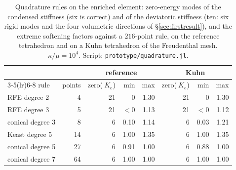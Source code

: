 \documentclass[11pt]{article}
\newcommand{\code}[1]{\texttt{#1}}
\theoremstyle{definition}
\theoremstyle{plain}
\begin{document}
\begin{table}[tbp]
\centering
\caption{Quadrature rules on the enriched element: zero-energy modes of the
condensed stiffness (six is correct) and of the deviatoric stiffness (ten:
six rigid modes and the four volumetric directions of
\S\ref{sec:firstresult}), and the extreme softening
factors against a $216$-point rule, on the reference tetrahedron and on a
Kuhn tetrahedron of the Freudenthal mesh. $\kappa/\mu = 10^4$. Script:
\code{prototype/quadrature.jl}.}
\label{tab:quadrature}
\begin{tabular}{@{}lrrrrrrr@{}}
\toprule
& & \multicolumn{3}{c}{reference} & \multicolumn{3}{c}{Kuhn} \\
\cmidrule(lr){3-5}\cmidrule(lr){6-8}
rule & points & zero($~K_e$) & min & max & zero($~K_e$) & min & max \\
\midrule
RFE degree 2            & 4   & 21 & 0     & 1.30 & 21 & 0     & 1.30 \\
RFE degree 3            & 5   & 21 & $<0$  & 1.13 & 21 & $<0$  & 1.12 \\
conical degree 3        & 8   & 6  & 0.10  & 1.14 & 6  & 0.03  & 1.21 \\
Keast degree 5          & 14  & 6  & 1.00  & 1.35 & 6  & 1.00  & 1.35 \\
conical degree 5        & 27  & 6  & 0.91  & 1.00 & 6  & 0.88  & 1.00 \\
conical degree 7        & 64  & 6  & 1.00  & 1.00 & 6  & 1.00  & 1.00 \\
\bottomrule
\end{tabular}
\end{table}
\end{document}
